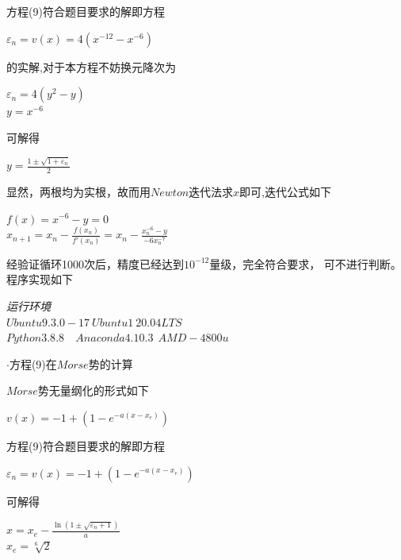 \documentclass[11pt, a4paper, oneside]{ctexart}
\begin{document}
{{{{方程(9)符合题目要求的解即方程
    \begin{center}
        $\varepsilon_n = v(x)=4(x^{-12}-x^{-6})$
    \end{center}
    的实解,对于本方程不妨换元降次为
    \begin{center}
        $\varepsilon_n =4(y^{2}-y)$\\
        $y=x^{-6}$
    \end{center}

    可解得
    \begin{center}
        $y=\frac{1\pm \sqrt{1+\varepsilon_n}}{2}$\\
    \end{center}

    显然，两根均为实根，故而用$Newton$迭代法求$x$即可,迭代公式如下
    \begin{center}
        $f(x)=x^{-6}-y=0$\\
        $x_{n+1}=x_{n}-{\frac {f(x_{n})}{f'(x_{n})}}=x_{n}-{\frac {x_{n}^{-6}-y}{-6x_{n}^{-7}}}$
    \end{center}
    
    
    经验证循环1000次后，精度已经达到$10^{-12}$量级，完全符合要求，
    可不进行判断。程序实现如下\\
    }

    {
        \begin{flushright}
            \scriptsize\emph{运行环境\\$Ubuntu 9.3.0-17\ Ubuntu1~20.04LTS$}\\
            \scriptsize\emph{$Python 3.8.8$\ \ $Anaconda 4.10.3\ \  AMD-4800u$}
                
            \end{flushright}
    }

}

{
    $\cdot $方程(9)在$Morse$势的计算
    

    \setlength{\parindent}{2em}$Morse$势无量纲化的形式如下
    \begin{center}
        $v(x)=-1+(1-e^{-a(x-x_{e})})$
    \end{center}

    方程(9)符合题目要求的解即方程
    \begin{center}
        $\varepsilon_n =v(x)=-1+(1-e^{-a(x-x_{e})})$
    \end{center}


    可解得
    \begin{center}
        $x=x_e- \frac{\ln(1\pm \sqrt{\varepsilon_n+1})}{a} $\\
        $x_e={\sqrt[6]{2} }$
    \end{center}
    

}}}
\end{document}
